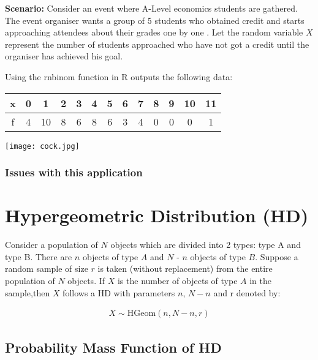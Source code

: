 \documentclass{article}
\begin{document}
\textbf{Scenario:} Consider an event
where A-Level economics students are gathered. The event organiser
wants a group of 5 students who obtained credit and starts 
approaching attendees about their grades one by one
. Let the random variable
$ X $ represent the number of students approached
who have not got a credit until the organiser
has achieved his goal.



Using the rnbinom function in R outputs the following data:

\begin{center}
  \begin{tabular}{|c|c|c|c|c|c|c|c|c|c|c|c|c|}
    \hline
    x & 0 & 1 & 2 & 3 & 4 & 5 & 6 & 7 & 8 & 9 & 10 & 11 \\
    \hline
    f & 4 & 10 & 8 & 6 & 8 & 6 & 3 & 4 & 0 & 0 & 0 & 1\\
    \hline
  \end{tabular}
\end{center}


\begin{center}
  \texttt{[image: cock.jpg]}
\end{center}

\subsubsection{Issues with this application}

\section{Hypergeometric Distribution (HD)}
Consider a population of $N$ objects which are divided into 2 types: type A and type B.
There are
$n$ objects of type $A$ and $N$ - $n$ objects of type $B$.
Suppose a random sample of size $r$ is taken
(without replacement) from the entire population of $N$ objects. If $X$ 
is the number of objects of
type $A$ in the sample,then $X$ follows a HD with parameters $n$, 
$N-n$ and r denoted by:

\begin{gather*}
  X \sim \text{HGeom}(n, N-n, r)
\end{gather*}

\subsection{Probability Mass Function of HD}
\end{document}
